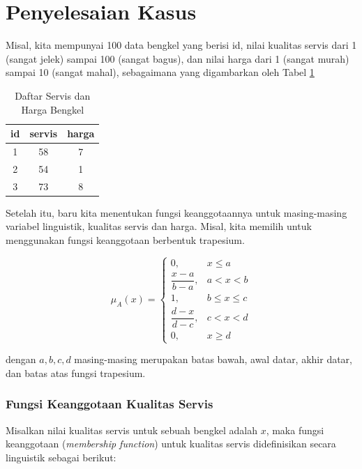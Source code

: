 \documentclass[12pt,a4paper]{article}
\theoremstyle{remark}
\begin{document}
\section{Penyelesaian Kasus}
Misal, kita mempunyai 100 data bengkel yang berisi id, nilai kualitas servis dari 1 (sangat jelek) sampai 100 (sangat bagus), dan nilai harga dari 1 (sangat murah) sampai 10 (sangat mahal), sebagaimana yang digambarkan oleh Tabel \ref{tab:servis_harga}

\begin{table}[H]
    \centering
    \caption{Daftar Servis dan Harga Bengkel}
    \label{tab:servis_harga}
    \begin{tabular}{|c|c|c|}
        \hline
        \textbf{id} & \textbf{servis} & \textbf{harga} \\ \hline
        1           & 58              & 7              \\
        2           & 54              & 1              \\
        3           & 73              & 8              \\ \hline
    \end{tabular}
\end{table}

Setelah itu, baru kita menentukan fungsi keanggotaannya untuk masing-masing variabel linguistik, kualitas servis dan harga. Misal, kita memilih untuk menggunakan fungsi keanggotaan berbentuk trapesium.

\[
    \mu_A(x) =
    \begin{cases}
        0,                    & x \leq a        \\
        \dfrac{x - a}{b - a}, & a < x < b       \\
        1,                    & b \leq x \leq c \\
        \dfrac{d - x}{d - c}, & c < x < d       \\
        0,                    & x \geq d
    \end{cases}
\]

dengan \(a, b, c, d\) masing-masing merupakan batas bawah, awal datar, akhir datar, dan batas atas fungsi trapesium.


\subsubsection*{Fungsi Keanggotaan Kualitas Servis}

Misalkan nilai kualitas servis untuk sebuah bengkel adalah $x$,
maka fungsi keanggotaan (\textit{membership function}) untuk kualitas servis didefinisikan secara linguistik sebagai berikut:
\end{document}
